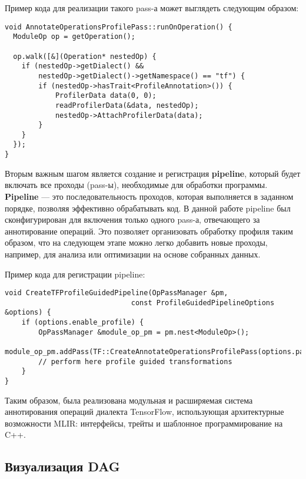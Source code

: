 Пример кода для реализации такого pass-а может выглядеть следующим образом:

\begin{lstlisting}[caption={Проход аннотирования операций}]
void AnnotateOperationsProfilePass::runOnOperation() {
  ModuleOp op = getOperation();

  op.walk([&](Operation* nestedOp) {
    if (nestedOp->getDialect() &&
        nestedOp->getDialect()->getNamespace() == "tf") {
        if (nestedOp->hasTrait<ProfileAnnotation>()) {
            ProfilerData data(0, 0);
            readProfilerData(&data, nestedOp);
            nestedOp->AttachProfilerData(data);
        }
    }
  });
}
\end{lstlisting}


Вторым важным шагом является создание и регистрация \textbf{pipeline}, который будет включать все проходы (pass-ы), необходимые для обработки программы.
\textbf{Pipeline} — это последовательность проходов, которая выполняется в заданном порядке, позволяя эффективно обрабатывать код.
В данной работе pipeline был сконфигурирован для включения только одного pass-а, отвечающего за аннотирование операций.
Это позволяет организовать обработку профиля таким образом, что на следующем этапе можно легко добавить новые проходы, например, для анализа или оптимизации на основе собранных данных.

Пример кода для регистрации pipeline:

\newpage

\begin{lstlisting}[caption={Регистрация PGO pipeline-а}]
void CreateTFProfileGuidedPipeline(OpPassManager &pm,
                              const ProfileGuidedPipelineOptions &options) {
    if (options.enable_profile) {
        OpPassManager &module_op_pm = pm.nest<ModuleOp>();
        module_op_pm.addPass(TF::CreateAnnotateOperationsProfilePass(options.path_to_profile));
        // perform here profile guided transformations
    }
}
\end{lstlisting}


Таким образом, была реализована модульная и расширяемая система аннотирования операций диалекта TensorFlow, использующая архитектурные возможности MLIR: интерфейсы, трейты и шаблонное программирование на C++.

\subsection{Визуализация DAG}


